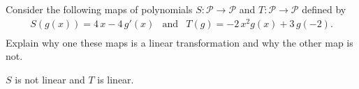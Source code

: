 
\begin{exerciseStatement}


Consider the following maps of polynomials \(S:\mathcal{P}\rightarrow\mathcal{P}\) and \(T:\mathcal{P}\rightarrow\mathcal{P}\) defined by 
\begin{align*} S(g(x))= 4 \, x - 4 \, g'\left(x\right)  & \text{and} & T(g)= -2 \, x^{2} g\left(x\right) + 3 \, g\left(-2\right) . \\ \end{align*}
             Explain why one these maps is a linear transformation and why the other map is not. 


\end{exerciseStatement}
    
\begin{exerciseAnswer} 


\(S\) is not linear and \(T\) is linear.


\end{exerciseAnswer}
    

